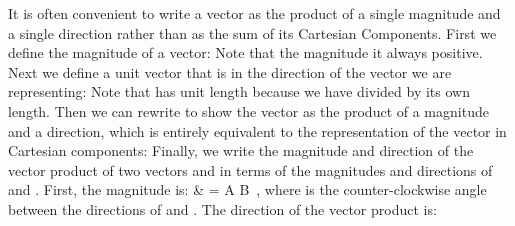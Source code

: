 {
It is often convenient to write a vector as the product of a single magnitude and
a single direction rather than as the sum of its Cartesian Components.
First we define the magnitude of a vector:
%
%
Note that the magnitude it always positive.
Next we define a unit vector that is in the direction of the vector we are representing:
%
%
Note that  has unit length because we have divided  by its own length.
Then we can rewrite  to show the vector as the product of a
magnitude and a direction, which is entirely equivalent to the representation of the
vector in Cartesian components:
%
%
Finally, we write the magnitude and direction of the vector product  of two vectors
 and  in terms of the magnitudes and directions of  and .
First, the magnitude is:
%
            {  & = A B \sin{\theta}\,,}
%
where \m{\theta} is the counter-clockwise angle between the directions of  and .
The direction of the vector product is:
%
}%
%

